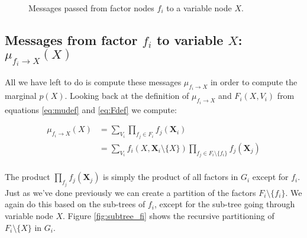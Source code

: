 \begin{figure}[h!]
{}

\caption{Messages passed from factor nodes $f_i$ to
a variable node $X$.}
\label{fig:messages_to_variable}
\end{figure}

\subsection{Messages from factor $f_i$ to variable 
	$X$: $\mu_{f_i \rightarrow X}(X)$}
All we have left to do is compute these messages 
$\mu_{f_i \rightarrow X}$ in order to compute the marginal $p(X)$.
Looking back at the definition of $\mu_{f_i \rightarrow X}$ and 
$F_i(X, V_i)$ from equations \ref{eq:mudef} and \ref{eq:Fdef}
we compute:

\begin{equation}\label{eq:message_decomp}\begin{split}
\mu_{f_i \rightarrow X} (X)
	&= \sum_{V_i}\prod_{f_j \in F_i} f_j(\textbf{X}_i) \\
	&= \sum_{V_i}f_i(X, \textbf{X}_i \setminus \{X\}) 
		\prod_{f_j \in F_i \setminus \{f_i\}} f_j(\textbf{X}_j)\\
\end{split}\end{equation}

\noindent
The product $\prod_{f_j} f_j(\textbf{X}_j)$ is simply the product
of all factors in $G_i$ except for $f_i$. Just as we've done previously
we can create a partition of the factors $F_i \setminus \{f_i\}$.
We again do this based on the sub-trees of $f_i$, except for the 
sub-tree going through variable node $X$. Figure \ref{fig:subtree_fi}
shows the recursive partitioning of $F_i\setminus \{X\}$ in $G_i$.

